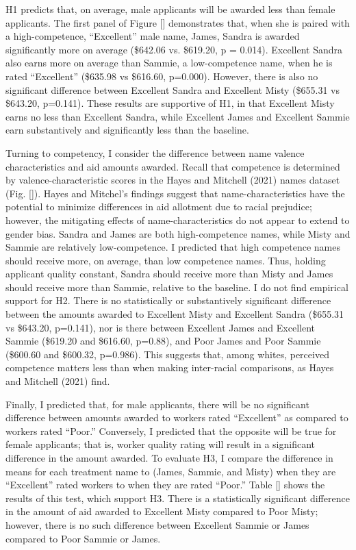 \documentclass[12pt]{article}%
\begin{document}
\begin{doublespace}

H1 predicts that, on average, male applicants will be awarded less than female applicants. The first panel of Figure [] demonstrates that, when she is paired with a high-competence, “Excellent” male name, James, Sandra is awarded significantly more on average (\$642.06 vs. \$619.20, p = 0.014). Excellent Sandra also earns more on average than Sammie, a low-competence name, when he is rated “Excellent” (\$635.98 vs \$616.60, p=0.000). However, there is also no significant difference between Excellent Sandra and Excellent Misty (\$655.31 vs \$643.20, p=0.141). These results are supportive of H1, in that Excellent Misty earns no less than Excellent Sandra, while Excellent James and Excellent Sammie earn substantively and significantly less than the baseline.


Turning to competency, I consider the difference between name valence characteristics and aid amounts awarded. Recall that competence is determined by valence-characteristic scores in the Hayes and Mitchell (2021) names dataset (Fig. []). Hayes and Mitchel’s findings suggest that name-characteristics have the potential to minimize differences in aid allotment due to racial prejudice; however, the mitigating effects of name-characteristics do not appear to extend to gender bias. Sandra and James are both high-competence names, while Misty and Sammie are relatively low-competence. I predicted that high competence names should receive more, on average, than low competence names. Thus, holding applicant quality constant, Sandra should receive more than Misty and James should receive more than Sammie, relative to the baseline. I do not find empirical support for H2. There is no statistically or substantively significant difference between the amounts awarded to Excellent Misty and Excellent Sandra (\$655.31 vs \$643.20, p=0.141), nor is there between Excellent James and Excellent Sammie (\$619.20 and \$616.60, p=0.88), and Poor James and Poor Sammie (\$600.60 and \$600.32, p=0.986). This suggests that, among whites, perceived competence matters less than when making inter-racial comparisons, as Hayes and Mitchell (2021) find.


Finally, I predicted that, for male applicants, there will be no significant difference between amounts awarded to workers rated “Excellent” as compared to workers rated “Poor.” Conversely, I predicted that the opposite will be true for female applicants; that is, worker quality rating will result in a significant difference in the amount awarded. To evaluate H3, I compare the difference in means for each treatment name to (James, Sammie, and Misty) when they are ``Excellent” rated workers to when they are rated “Poor.” Table [] shows the results of this test, which support H3. There is a statistically significant difference in the amount of aid awarded to Excellent Misty compared to Poor Misty; however, there is no such difference between Excellent Sammie or James compared to Poor Sammie or James.


\end{doublespace}
\end{document}
